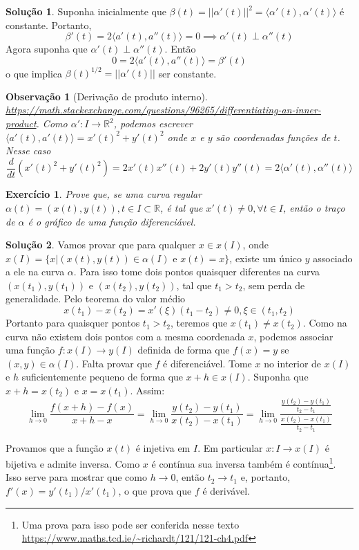 \documentclass[a4paper,12pt]{article}
\newcommand{\R}{\mathbb{R}}
\theoremstyle{exer}
\newtheorem{exercise}{Exercício}
\theoremstyle{definition}
\newtheorem{solution}{Solução}
\theoremstyle{plain}
\newtheorem{remark}{Observação}
\begin{document}
\begin{solution}
    Suponha inicialmente que $\beta(t) = ||\alpha '(t)||^2 = \langle \alpha'(t), \alpha
    '(t) \rangle$ é constante. Portanto, 
    $$
    \beta'(t) = 2\langle a'(t), a''(t) \rangle = 0 \implies \alpha'(t) \perp \alpha''(t)
    $$
    Agora suponha que $\alpha'(t) \perp \alpha''(t)$. Então 
    $$
    0 = 2\langle a'(t), a''(t) \rangle = \beta'(t)
    $$
    o que implica $\beta(t)^{1/2} = ||\alpha '(t)||$ ser constante.  


    \begin{remark}[Derivação de produto interno]
        \url{https://math.stackexchange.com/questions/96265/differentiating-an-inner-product}.
        Como $\alpha': I \to \R^2$, podemos escrever $\langle a'(t), a'(t)
        \rangle = x'(t)^2 + y'(t)^2$ onde $x$ e $y$ são coordenadas funções de
        $t$. Nesse caso 
        $$
        \frac{d}{dt}(x'(t)^2 + y'(t)^2) = 2x'(t)x''(t) + 2y'(t)y''(t) = 2\langle \alpha '(t), \alpha''(t) \rangle
        $$
    \end{remark}
\end{solution}

\begin{exercise}
    Prove que, se uma curva regular $\alpha(t) = (x(t), y(t)), t \in I \subset
    \R$, é tal que $x'(t) \neq 0, \forall t \in I$, então o traço de $\alpha$ é o gráfico de uma função diferenciável.
\end{exercise}

\begin{solution}
    Vamos provar que para qualquer $x \in x(I)$, onde $x(I) = \{x | (x(t),
    y(t)) \in \alpha(I) \text{ e } x(t) = x\}$, existe um único $y$ associado
    a ele na curva $\alpha$. Para isso tome dois pontos quaisquer diferentes na curva
    $(x(t_1), y(t_1))$ e $(x(t_2), y(t_2))$, tal que $t_1 > t_2$, sem perda de
    generalidade. Pelo teorema do valor médio 
    $$
    x(t_1) - x(t_2) = x'(\xi)(t_1 - t_2) \neq 0,  \xi \in (t_1, t_2)
    $$
    Portanto para quaisquer pontos $t_1 > t_2$, teremos que $x(t_1) \neq
    x(t_2)$. Como na curva não existem dois pontos com a mesma coordenada $x$,
    podemos associar uma função $f: x(I) \to y(I)$ definida de forma que 
    $f(x) = y$ se $(x,y) \in \alpha(I)$. Falta provar que $f$ é diferenciável.
    Tome $x$ no interior de $x(I)$ e $h$ suficientemente pequeno de forma que
    $x + h \in x(I)$. Suponha que $x+h = x(t_2)$ e $x = x(t_1)$. Assim:
    $$
    \lim_{h \to 0} \frac{f(x + h) - f(x)}{x + h - x} = \lim_{h\to 0}\frac{y(t_2) - y(t_1)}{x(t_2) - x(t_1)} = \lim_{h\to 0} \frac{\frac{y(t_2) - y(t_1)}{t_2 - t_1}}{\frac{x(t_2) - x(t_1)}{t_2-t_1}}
    $$
    
    Provamos que a função $x(t)$ é injetiva em $I$. Em particular $x: I \to
    x(I)$ é bijetiva e admite inversa. Como $x$ é contínua sua inversa também
    é contínua\footnote{Uma prova para isso pode ser conferida nesse texto
    \url{https://www.maths.tcd.ie/~richardt/121/121-ch4.pdf}}. Isso serve para
    mostrar que como $h \to 0$, então $t_2 \to t_1$ e, portanto, $f'(x) =
    y'(t_1)/x'(t_1)$, o que prova que $f$ é derivável. 
    

\end{solution}
\end{document}
